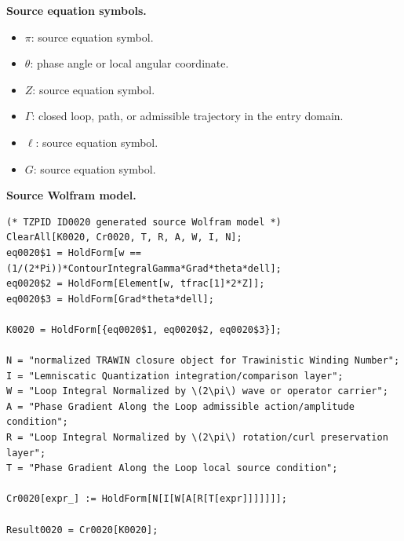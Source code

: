 \begin{minipage}[t]{0.49\linewidth}
\begingroup
\small
\raggedright
\textbf{Source equation symbols.}\par
\begin{itemize}[leftmargin=1.35em,itemsep=1pt,topsep=1pt,parsep=0pt]
    \item $\pi$: source equation symbol.
    \item $\theta$: phase angle or local angular coordinate.
    \item $Z$: source equation symbol.
    \item $\Gamma$: closed loop, path, or admissible trajectory in the entry domain.
    \item $\ell$: source equation symbol.
    \item $G$: source equation symbol.
\end{itemize}
\endgroup
\end{minipage}\hfill
\begin{minipage}[t]{0.47\linewidth}
\begingroup
\scriptsize
\raggedright
\textbf{Source Wolfram model.}\par
\begin{Verbatim}[fontsize=\tiny,breaklines=true,breakanywhere=true]
(* TZPID ID0020 generated source Wolfram model *)
ClearAll[K0020, Cr0020, T, R, A, W, I, N];
eq0020$1 = HoldForm[w == (1/(2*Pi))*ContourIntegralGamma*Grad*theta*dell];
eq0020$2 = HoldForm[Element[w, tfrac[1]*2*Z]];
eq0020$3 = HoldForm[Grad*theta*dell];

K0020 = HoldForm[{eq0020$1, eq0020$2, eq0020$3}];

N = "normalized TRAWIN closure object for Trawinistic Winding Number";
I = "Lemniscatic Quantization integration/comparison layer";
W = "Loop Integral Normalized by \(2\pi\) wave or operator carrier";
A = "Phase Gradient Along the Loop admissible action/amplitude condition";
R = "Loop Integral Normalized by \(2\pi\) rotation/curl preservation layer";
T = "Phase Gradient Along the Loop local source condition";

Cr0020[expr_] := HoldForm[N[I[W[A[R[T[expr]]]]]]];

Result0020 = Cr0020[K0020];
\end{Verbatim}
\endgroup
\end{minipage}

